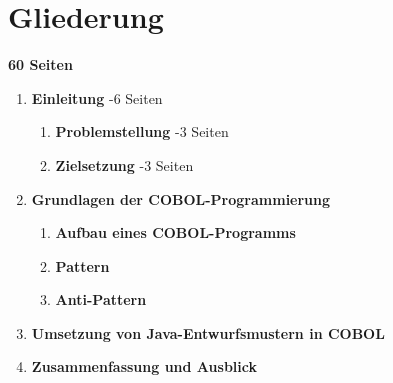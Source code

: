 \section{Gliederung}

\begin{framed}
\hfill \textbf{\LARGE{60 Seiten}}
\begin{enumerate}[label=\arabic*.]
	\item 
    	\textbf{Einleitung} -6 Seiten
    	\begin{enumerate}[label=\arabic*.]
    		\item \textbf{Problemstellung} -3 Seiten
        	\item \textbf{Zielsetzung} -3 Seiten
    	\end{enumerate}
    \item \textbf{Grundlagen der COBOL-Programmierung}
    	\begin{enumerate}[label=\arabic*.]
    	\item \textbf{Aufbau eines COBOL-Programms}
        \item \textbf{Pattern}
        \item \textbf{Anti-Pattern}
    	\end{enumerate}
    \item \textbf{Umsetzung von Java-Entwurfsmustern in COBOL}
    \item \textbf{Zusammenfassung und Ausblick}
\end{enumerate}
\end{framed}